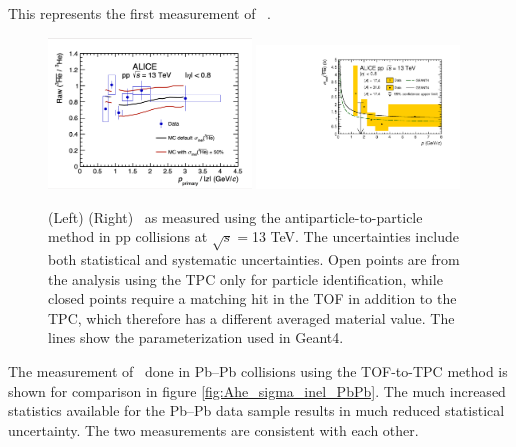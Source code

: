 This represents the first measurement of \sigmainel\ .
\begin{figure}
    \centering
    \includegraphics[width=0.48\textwidth]{figures/he3bar_he3_ratio.png}
    \includegraphics[width=0.48\textwidth]{figures/Antihelium_inelastic_cross_section.pdf}
    \caption{(Left) (Right) \sigmainel\ as measured using the antiparticle-to-particle method in pp collisions at $\sqrt{s}=$13 TeV. The uncertainties include both statistical and systematic uncertainties. Open points are from the analysis using the TPC only for particle identification, while closed points require a matching hit in the TOF in addition to the TPC, which therefore has a different averaged material value. The lines show the parameterization used in Geant4.}
    \label{fig:Ahe_sigma_inel_pp}
\end{figure}

The measurement of \sigmainel\ done in Pb--Pb collisions using the TOF-to-TPC method is shown for comparison in figure \ref{fig:Ahe_sigma_inel_PbPb}. The much increased statistics available for the Pb--Pb data sample results in much reduced statistical uncertainty. The two measurements are consistent with each other.

